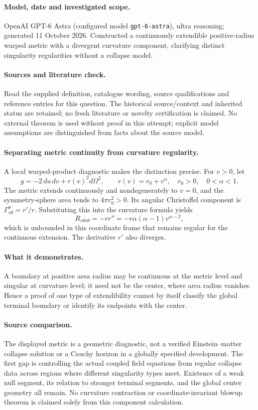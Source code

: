 \documentclass[11pt]{article}
\begin{document}
\paragraph{Model, date and investigated scope.}
OpenAI GPT-6 Astra (configured model \texttt{gpt-6-astra}), ultra reasoning; generated 11 October 2026. Constructed a continuously extendible positive-radius warped metric with a divergent curvature component, clarifying distinct singularity regularities without a collapse model.

\paragraph{Sources and literature check.}
Read the supplied definition, catalogue wording, source qualifications and reference entries for this question. The historical source/context and inherited status are retained; no fresh literature or novelty certification is claimed. No external theorem is used without proof in this attempt; explicit model assumptions are distinguished from facts about the source model.

\paragraph{Separating metric continuity from curvature regularity.} A local warped-product diagnostic makes the distinction precise. For \(v>0\), let
\[
 g=-2\,du\,dv+r(v)^2d\Omega^2,\qquad r(v)=r_0+v^\alpha,
 \quad r_0>0,\quad0<\alpha<1.
\]
The metric extends continuously and nondegenerately to \(v=0\), and the symmetry-sphere area tends to \(4\pi r_0^2>0\). Its angular Christoffel component is \(\Gamma^\theta_{v\theta}=r'/r\). Substituting this into the curvature formula yields
\[
 R_{v\theta v\theta}=-rr''=-r\alpha(\alpha-1)v^{\alpha-2},
\]
which is unbounded in this coordinate frame that remains regular for the continuous extension. The derivative \(r'\) also diverges.
\paragraph{What it demonstrates.} A boundary at positive area radius may be continuous at the metric level and singular at curvature level; it need not be the center, where area radius vanishes. Hence a proof of one type of extendibility cannot by itself classify the global terminal boundary or identify its endpoints with the center.
\paragraph{Source comparison.} The displayed metric is a geometric diagnostic, not a verified Einstein--matter collapse solution or a Cauchy horizon in a globally specified development. The first gap is controlling the actual coupled field equations from regular collapse data across regions where different singularity types meet. Existence of a weak null segment, its relation to stronger terminal segments, and the global center geometry all remain. No curvature contraction or coordinate-invariant blowup theorem is claimed solely from this component calculation.
\end{document}
